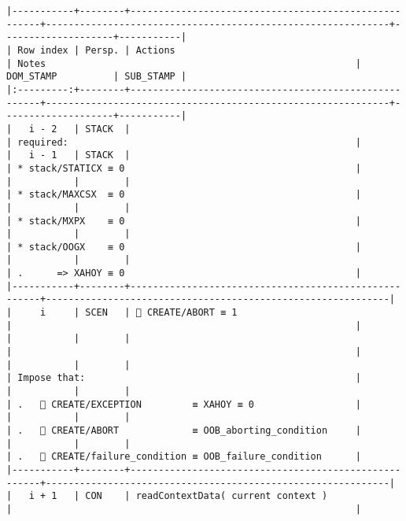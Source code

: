 \documentclass[varwidth=\maxdimen,margin=0.5cm,multi={verbatim}]{standalone}
\begin{document}
\begin{verbatim}
|-----------+--------+------------------------------------------------------+-------------------------------------------------------------+--------------------+-----------|
| Row index | Persp. | Actions                                              | Notes                                                       | DOM_STAMP          | SUB_STAMP |
|:---------:+--------+------------------------------------------------------+-------------------------------------------------------------+--------------------+-----------|
|   i - 2   | STACK  |                                                      | required:                                                   |
|   i - 1   | STACK  |                                                      | * stack/STATICX ≡ 0                                         |
|           |        |                                                      | * stack/MAXCSX  ≡ 0                                         |
|           |        |                                                      | * stack/MXPX    ≡ 0                                         |
|           |        |                                                      | * stack/OOGX    ≡ 0                                         |
|           |        |                                                      | .      => XAHOY ≡ 0                                         |
|-----------+--------+------------------------------------------------------+-------------------------------------------------------------|
|     i     | SCEN   |  CREATE/ABORT ≡ 1                                   |                                                             |
|           |        |                                                      |                                                             |
|           |        |                                                      | Impose that:                                                |
|           |        |                                                      | .    CREATE/EXCEPTION         ≡ XAHOY ≡ 0                  |
|           |        |                                                      | .    CREATE/ABORT             ≡ OOB_aborting_condition     |
|           |        |                                                      | .    CREATE/failure_condition ≡ OOB_failure_condition      |
|-----------+--------+------------------------------------------------------+-------------------------------------------------------------|
|   i + 1   | CON    | readContextData( current context )                   |                                                             |

\end{verbatim}
\end{document}
